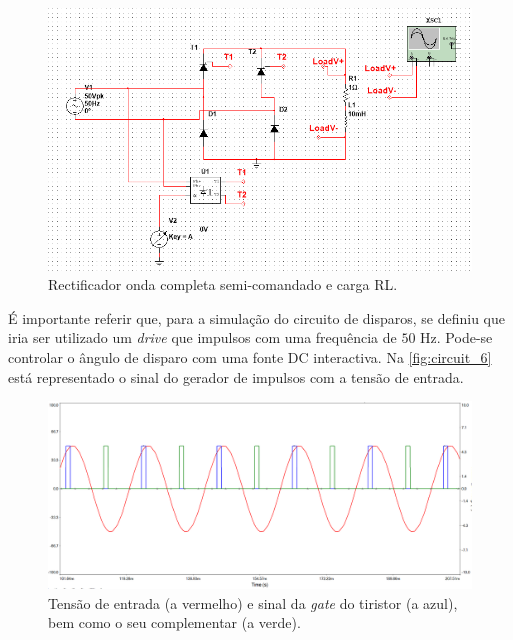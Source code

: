 \documentclass[a4paper,11pt]{article}
\numberwithin{equation}{section}
\begin{document}
\begin{figure}[h]
	\centering
	\includegraphics[keepaspectratio=true, scale=0.5]{img/circuito3}
	\caption{Rectificador onda completa semi-comandado e carga RL.}
	\label{fig:circuit_5}
	\vspace{-0.8em}
\end{figure}
\pagebreak 

É importante referir que, para a simulação do circuito de disparos, se definiu que iria ser utilizado um \textit{drive} que impulsos com uma frequência  de $50$ Hz. Pode-se controlar o ângulo de  disparo com uma fonte DC interactiva. Na \autoref{fig:circuit_6} está representado o sinal do gerador de impulsos com a tensão de entrada.
\vspace{17mm}

\begin{figure}[h]
	\centering
	\includegraphics[keepaspectratio=true, scale=0.4]{img/circuito4}
	\caption{Tensão de entrada (a vermelho) e sinal da \textit{gate} do tiristor (a azul), bem como o seu complementar (a verde).}
	\label{fig:circuit_6}
	\vspace{-0.8em}
\end{figure}
\end{document}
